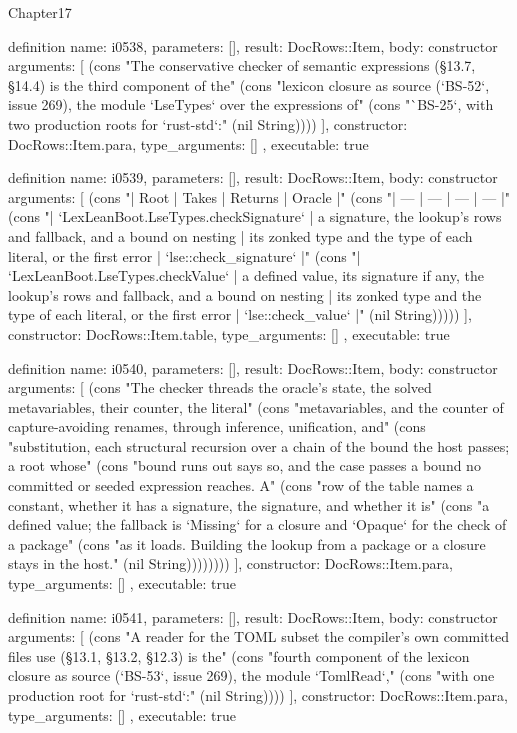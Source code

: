 \begin{lexlean}{Chapter17}
\begin{semanticmodule}
definition{
  name: i0538,
  parameters: [],
  result: DocRows::Item,
  body: constructor{
    arguments: [
      (cons "The conservative checker of semantic expressions (§13.7, §14.4) is the third component of the" (cons "lexicon closure as source (`BS-52`, issue 269), the module `LseTypes` over the expressions of" (cons "`BS-25`, with two production roots for `rust-std`:" (nil String))))
    ],
    constructor: DocRows::Item.para,
    type_arguments: []
  },
  executable: true
}

definition{
  name: i0539,
  parameters: [],
  result: DocRows::Item,
  body: constructor{
    arguments: [
      (cons "| Root | Takes | Returns | Oracle |" (cons "| --- | --- | --- | --- |" (cons "| `LexLeanBoot.LseTypes.checkSignature` | a signature, the lookup's rows and fallback, and a bound on nesting | its zonked type and the type of each literal, or the first error | `lse::check_signature` |" (cons "| `LexLeanBoot.LseTypes.checkValue` | a defined value, its signature if any, the lookup's rows and fallback, and a bound on nesting | its zonked type and the type of each literal, or the first error | `lse::check_value` |" (nil String)))))
    ],
    constructor: DocRows::Item.table,
    type_arguments: []
  },
  executable: true
}

definition{
  name: i0540,
  parameters: [],
  result: DocRows::Item,
  body: constructor{
    arguments: [
      (cons "The checker threads the oracle's state, the solved metavariables, their counter, the literal" (cons "metavariables, and the counter of capture-avoiding renames, through inference, unification, and" (cons "substitution, each structural recursion over a chain of the bound the host passes; a root whose" (cons "bound runs out says so, and the case passes a bound no committed or seeded expression reaches. A" (cons "row of the table names a constant, whether it has a signature, the signature, and whether it is" (cons "a defined value; the fallback is `Missing` for a closure and `Opaque` for the check of a package" (cons "as it loads. Building the lookup from a package or a closure stays in the host." (nil String))))))))
    ],
    constructor: DocRows::Item.para,
    type_arguments: []
  },
  executable: true
}

definition{
  name: i0541,
  parameters: [],
  result: DocRows::Item,
  body: constructor{
    arguments: [
      (cons "A reader for the TOML subset the compiler's own committed files use (§13.1, §13.2, §12.3) is the" (cons "fourth component of the lexicon closure as source (`BS-53`, issue 269), the module `TomlRead`," (cons "with one production root for `rust-std`:" (nil String))))
    ],
    constructor: DocRows::Item.para,
    type_arguments: []
  },
  executable: true
}


\end{semanticmodule}
\end{lexlean}
